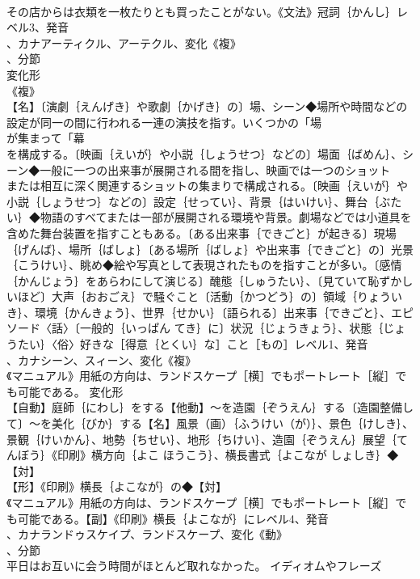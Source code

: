 \documentclass[8pt]{extreport}
\begin{document}
\begin{CJK}{UTF8}{min}
\\	その店からは衣類を一枚たりとも買ったことがない。《文法》冠詞｛かんし｝レベル3、発音
\\	、カナアーティクル、アーテクル、変化《複》
\\	、分節
\\	変化形 
\\	《複》
\\	【名】〔演劇｛えんげき｝や歌劇｛かげき｝の〕場、シーン◆場所や時間などの設定が同一の間に行われる一連の演技を指す。いくつかの「場
\\	が集まって「幕
\\	を構成する。〔映画｛えいが｝や小説｛しょうせつ｝などの〕場面｛ばめん｝、シーン◆一般に一つの出来事が展開される間を指し、映画では一つのショット
\\	または相互に深く関連するショットの集まりで構成される。〔映画｛えいが｝や小説｛しょうせつ｝などの〕設定｛せってい｝、背景｛はいけい｝、舞台｛ぶたい｝◆物語のすべてまたは一部が展開される環境や背景。劇場などでは小道具を含めた舞台装置を指すこともある。〔ある出来事｛できごと｝が起きる〕現場｛げんば｝、場所｛ばしょ｝〔ある場所｛ばしょ｝や出来事｛できごと｝の〕光景｛こうけい｝、眺め◆絵や写真として表現されたものを指すことが多い。〔感情｛かんじょう｝をあらわにして演じる〕醜態｛しゅうたい｝、〔見ていて恥ずかしいほど〕大声｛おおごえ｝で騒ぐこと〔活動｛かつどう｝の〕領域｛りょういき｝、環境｛かんきょう｝、世界｛せかい｝〔語られる〕出来事｛できごと｝、エピソード〈話〉〔一般的｛いっぱん てき｝に〕状況｛じょうきょう｝、状態｛じょうたい｝〈俗〉好きな［得意｛とくい｝な］こと［もの］レベル1、発音
\\	、カナシーン、スィーン、変化《複》
\\	《マニュアル》用紙の方向は、ランドスケープ［横］でもポートレート［縦］でも可能である。	変化形 
\\	【自動】庭師｛にわし｝をする【他動】～を造園｛ぞうえん｝する〔造園整備して〕～を美化｛びか｝する【名】風景（画）｛ふうけい（が）｝、景色｛けしき｝、景観｛けいかん｝、地勢｛ちせい｝、地形｛ちけい｝、造園｛ぞうえん｝展望｛てんぼう｝《印刷》横方向｛よこ ほうこう｝、横長書式｛よこなが しょしき｝◆【対】
\\	【形】《印刷》横長｛よこなが｝の◆【対】
\\	《マニュアル》用紙の方向は、ランドスケープ［横］でもポートレート［縦］でも可能である。【副】《印刷》横長｛よこなが｝にレベル4、発音
\\	、カナランドゥスケイプ、ランドスケープ、変化《動》
\\	、分節
\\	平日はお互いに会う時間がほとんど取れなかった。	イディオムやフレーズ 

\end{CJK}
\end{document}
